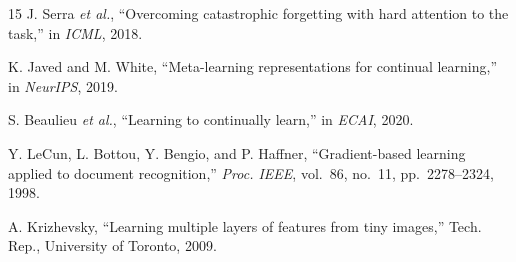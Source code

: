 \documentclass[conference]{IEEEtran}
\begin{document}
\begin{thebibliography}{15}
 J. Serra \textit{et al.}, ``Overcoming catastrophic forgetting with hard attention to the task,'' in \textit{ICML}, 2018.

 K. Javed and M. White, ``Meta-learning representations for continual learning,'' in \textit{NeurIPS}, 2019.

 S. Beaulieu \textit{et al.}, ``Learning to continually learn,'' in \textit{ECAI}, 2020.

 Y. LeCun, L. Bottou, Y. Bengio, and P. Haffner, ``Gradient-based learning applied to document recognition,'' \textit{Proc. IEEE}, vol.~86, no.~11, pp.~2278--2324, 1998.

 A. Krizhevsky, ``Learning multiple layers of features from tiny images,'' Tech. Rep., University of Toronto, 2009.
\end{thebibliography}
\end{document}

